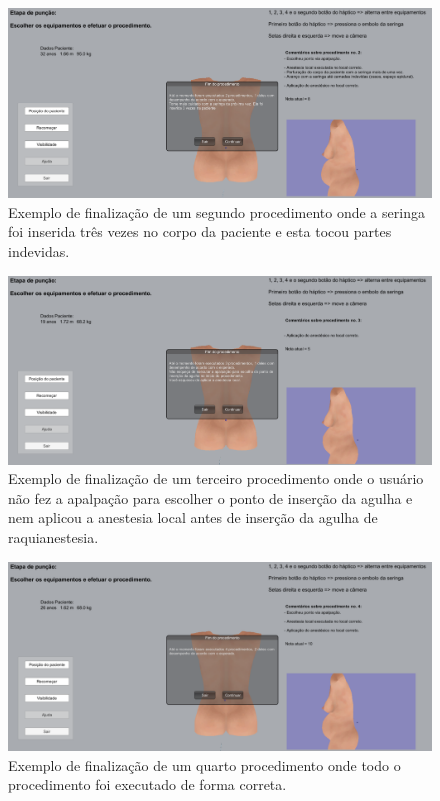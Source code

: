 \begin{figure}[ht!]
    \centering
    \includegraphics[width=\textwidth]{capitulos/figuras/sistema-exemplo-execucao-procedimento-2.png} 
    \caption{Exemplo de finalização de um segundo procedimento onde a seringa foi inserida três vezes no corpo da paciente e esta tocou partes indevidas.}
    \label{fig:sistemaExecucao2seringa}
\end{figure}

\begin{figure}[ht!]
    \centering
    \includegraphics[width=\textwidth]{capitulos/figuras/sistema-exemplo-execucao-procedimento-3.png} 
    \caption{Exemplo de finalização de um terceiro procedimento onde o usuário não fez a apalpação para escolher o ponto de inserção da agulha e nem aplicou a anestesia local antes de inserção da agulha de raquianestesia.}
    \label{fig:sistemaExecucao3faltouApalpacaoAnestesiaLocal}
\end{figure}

\begin{figure}[ht!]
    \centering
    \includegraphics[width=\textwidth]{capitulos/figuras/sistema-exemplo-execucao-procedimento-4.png} 
    \caption{Exemplo de finalização de um quarto procedimento onde todo o procedimento foi executado de forma correta.}
    \label{fig:sistemaExecucao4correto}
\end{figure}

